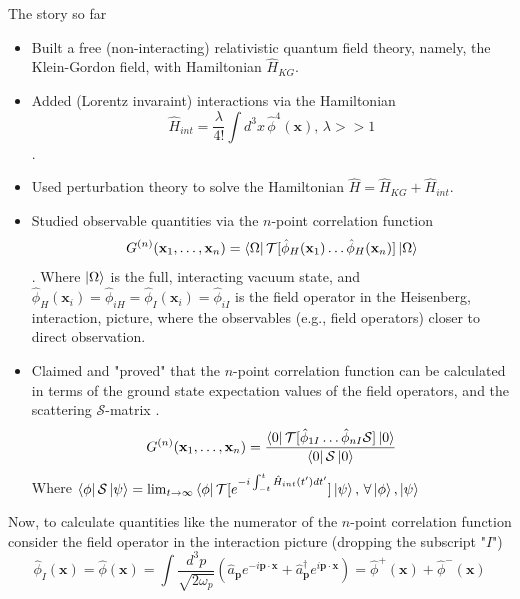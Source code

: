 \noindent The story so far
\begin{itemize}
\item Built a free (non-interacting) relativistic quantum field theory, namely, the Klein-Gordon field, with Hamiltonian $\hat{H}_{KG}$.

\item Added (Lorentz invaraint) interactions via the Hamiltonian
	\subitem \begin{equation} \hat{H}_{int} = \frac{\lambda}{4!} \int d^3 x \, \hat{\phi}^4(\textbf{x}), \, \lambda >> 1 \end{equation}.

\item Used perturbation theory to solve the Hamiltonian $\hat{H} = \hat{H}_{KG} + \hat{H}_{int}$.

\item Studied observable quantities via the $n$-point correlation function
	\subitem \begin{equation} G^{(n)}(\textbf{x}_1, \dots, \textbf{x}_n) = \bra{\Omega} \mathcal{T}[\hat{\phi}_H(\textbf{x}_1) \dots \hat{\phi}_H(\textbf{x}_n) ] \ket{\Omega} \end{equation}.
	\subitem Where $\ket{\Omega}$ is the full, interacting vacuum state, and $\hat{\phi}_H(\textbf{x}_i) = \hat{\phi}_{iH} = \hat{\phi}_I(\textbf{x}_i) = \hat{\phi}_{iI}$ is the field operator in the Heisenberg, interaction, picture, where the observables (e.g., field operators) closer to direct observation.

\item Claimed and "proved" that the $n$-point correlation function can be calculated in terms of the ground state expectation values of the field operators, and the scattering $\mathcal{S}$-matrix .
	\subitem \begin{equation} G^{(n)}(\textbf{x}_1, \dots, \textbf{x}_n) = \frac{\bra{0} \mathcal{T}[\hat{\phi}_{1I} \dots \hat{\phi}_{nI} \mathcal{S} ]\ket{0} }{\bra{0} \mathcal{S} \ket{0}} \end{equation}
	\subitem Where $\bra{\phi}\mathcal{S}\ket{\psi} = \lim_{t\to\infty} \bra{\phi} \mathcal{T}[e^{-i \int^t_{-t} \hat{H}_{int}(t') dt'}] \ket{\psi}, \, \forall \ket{\phi}, \ket{\psi}$
\end{itemize}

\noindent Now, to calculate quantities like the numerator of the $n$-point correlation function consider the field operator in the interaction picture (dropping the subscript "$I$")
\begin{equation}
\hat{\phi}_I(\textbf{x}) = \hat{\phi}(\textbf{x}) = \int \frac{d^3 p}{\sqrt{2 \omega_p}} (\hat{a}_\textbf{p} e^{-i \textbf{p} \cdot \textbf{x}} + \hat{a}^\dagger_\textbf{p} e^{i \textbf{p} \cdot \textbf{x}} ) = \hat{\phi}^+(\textbf{x}) + \hat{\phi}^-(\textbf{x})
\end{equation}

